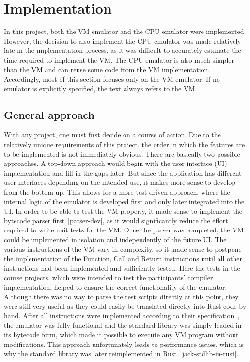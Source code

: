 \section{Implementation} \label{implementation}
In this project, both the VM emulator and the CPU emulator were implemented.
However, the decision to also implement the CPU emulator was made relatively late in the implementation process, as it was difficult to accurately estimate the time required to implement the VM.
The CPU emulator is also much simpler than the VM and can reuse some code from the VM implementation.
Accordingly, most of this section focuses only on the VM emulator.
If no emulator is explicitly specified, the text always refers to the VM.

\subsection{General approach}
With any project, one must first decide on a course of action.
Due to the relatively unique requirements of this project, the order in which the features are to be implemented is not immediately obvious.
There are basically two possible approaches.
A top-down approach would begin with the user interface (UI) implementation and fill in the gaps later.
But since the application has different user interfaces depending on the intended use, it makes more sense to develop from the bottom up.
This allows for a more test-driven approach, where the internal logic of the emulator is developed first and only later integrated into the UI.
In order to be able to test the VM properly, it made sense to implement the bytecode parser first~\ref{parser-dev}, as it would significantly reduce the effort required to write unit tests for the VM.
Once the parser was completed, the VM could be implemented in isolation and independently of the future UI.
The various instructions of the VM vary in complexity, so it made sense to postpone the implementation of the Function, Call and Return instructions until all other instructions had been implemented and sufficiently tested.
Here the tests in the course projects, which were intended to test the participants' compiler implementation, helped to ensure the correct functionality of the emulator.
Although there was no way to parse the test scripts directly at this point, they were still very useful as they could easily be translated directly into Rust code by hand.
After all instructions were implemented according to their specification~\cite{nisan2005}, the emulator was fully functional and the standard library was simply loaded in its bytecode form, which made it possible to execute any VM program without modifications.
This approach unfortunately leads to performance issues, which is why the standard library was later reimplemented in Rust~\ref{jack-stdlib-in-rust}.

